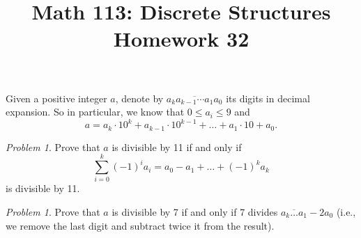 \documentclass[11pt,twoside]{amsart}
\title{Math 113: Discrete Structures\\ Homework 32}
\theoremstyle{plain}
\theoremstyle{remark}
\newtheorem{prob}[prop]{Problem}
\theoremstyle{definition}
\theoremstyle{definition}
\begin{document}
\maketitle



\noindent
Given a positive integer $a$, denote by $\overline{a_k a_{k-1} \cdots a_1a_0}$ its digits in decimal expansion. So in particular, we know that $0\leq a_i \leq 9$ and
\[a=a_k\cdot 10^k+ a_{k-1}\cdot 10^{k-1}+ \dots + a_1\cdot 10 + a_0.\]

\begin{prob}
Prove that $a$ is divisible by 11 if and only if 
\[\sum_{i=0}^k(-1)^ia_i=a_0-a_1+\dots+(-1)^ka_k\]
 is divisible by 11.
\end{prob}

\begin{prob}
 Prove that $a$ is divisible by 7 if and only if 7 divides $\overline{a_k\dots a_1}-2a_0$ (i.e., we remove the last digit and subtract twice it from the result). 
\end{prob}
\end{document}
